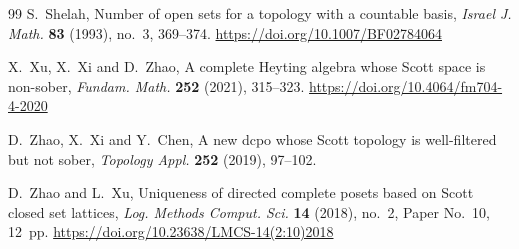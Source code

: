 \documentclass[11pt,reqno]{amsart}
\theoremstyle{definition}
\numberwithin{equation}{section}
\begin{document}
\begin{thebibliography}{99}
S.~Shelah,
Number of open sets for a topology with a countable basis,
\emph{Israel J. Math.} \textbf{83} (1993), no.~3, 369--374.
\url{https://doi.org/10.1007/BF02784064}

X.~Xu, X.~Xi and D.~Zhao,
A complete Heyting algebra whose Scott space is non-sober,
\emph{Fundam. Math.} \textbf{252} (2021), 315--323.
\url{https://doi.org/10.4064/fm704-4-2020}

D.~Zhao, X.~Xi and Y.~Chen,
A new dcpo whose Scott topology is well-filtered but not sober,
\emph{Topology Appl.} \textbf{252} (2019), 97--102.

D.~Zhao and L.~Xu,
Uniqueness of directed complete posets based on Scott closed set lattices,
\emph{Log. Methods Comput. Sci.} \textbf{14} (2018), no.~2,
Paper No.~10, 12~pp.
\url{https://doi.org/10.23638/LMCS-14(2:10)2018}

\end{thebibliography}
\end{document}
